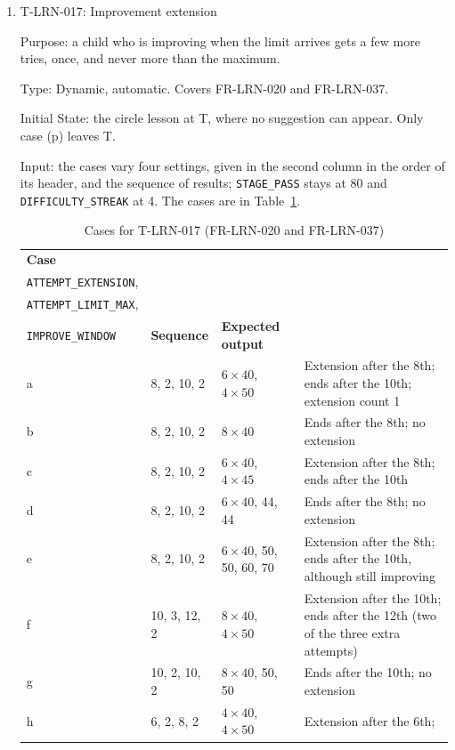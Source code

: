 \documentclass[12pt, titlepage]{article}
\newcommand{\testitem}[1]{\item #1\par\nopagebreak}
\begin{document}
\begin{enumerate}
\testitem{T-LRN-017: Improvement extension}

Purpose: a child who is improving when the limit arrives gets a few more
tries, once, and never more than the maximum.

Type: Dynamic, automatic. Covers FR-LRN-020 and FR-LRN-037.

Initial State: the circle lesson at T, where no suggestion can appear. Only
case (p) leaves T.

Input: the cases vary four settings, given in the second column in the
order of its header, and the sequence of results; \texttt{STAGE\_PASS}
stays at 80 and \texttt{DIFFICULTY\_STREAK} at 4. The cases are in
Table~\ref{tab:t-lrn-017}.

\begin{table}[htbp]
\centering\footnotesize
\setlength{\tabcolsep}{4pt}
\caption{Cases for T-LRN-017 (FR-LRN-020 and FR-LRN-037)}
\label{tab:t-lrn-017}
\begin{tabularx}{\textwidth}{@{}l l >{\raggedright\arraybackslash}X
  >{\raggedright\arraybackslash}X@{}}
\toprule
\textbf{Case} &
\begin{tabular}[b]{@{}l@{}}\texttt{ATTEMPT\_LIMIT},\\
\texttt{ATTEMPT\_EXTENSION},\\ \texttt{ATTEMPT\_LIMIT\_MAX},\\
\texttt{IMPROVE\_WINDOW}\end{tabular} & \textbf{Sequence} &
\textbf{Expected output}\\
\midrule
a & 8, 2, 10, 2 & $6 \times 40$, $4 \times 50$ & Extension after the 8th;
ends after the 10th; extension count 1\\
b & 8, 2, 10, 2 & $8 \times 40$ & Ends after the 8th; no extension\\
c & 8, 2, 10, 2 & $6 \times 40$, $4 \times 45$ & Extension after the 8th;
ends after the 10th\\
d & 8, 2, 10, 2 & $6 \times 40$, 44, 44 & Ends after the 8th; no
extension\\
e & 8, 2, 10, 2 & $6 \times 40$, 50, 50, 60, 70 & Extension after the 8th;
ends after the 10th, although still improving\\
f & 10, 3, 12, 2 & $8 \times 40$, $4 \times 50$ & Extension after the
10th; ends after the 12th (two of the three extra attempts)\\
g & 10, 2, 10, 2 & $8 \times 40$, 50, 50 & Ends after the 10th; no
extension\\
h & 6, 2, 8, 2 & $4 \times 40$, $4 \times 50$ & Extension after the 6th;

\end{tabularx}
\end{table}
\end{enumerate}
\end{document}
